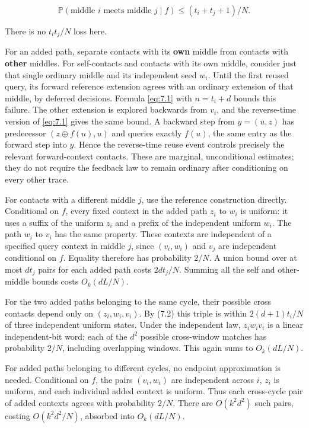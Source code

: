 \documentclass[11pt]{article}
\theoremstyle{remark}
\begin{document}
\[
 \mathbb P(\text{middle }i\text{ meets middle }j\mid f)
 \le(t_i+t_j+1)/N.
 \tag{7.3}\label{eq:7.3}
\]

There is no \(t_it_j/N\) loss here.

For an added path, separate contacts with its \textbf{own} middle from
contacts with \textbf{other} middles. For self-contacts and contacts
with its own middle, consider just that single ordinary middle and its
independent seed \(w_i\). Until the first reused query, its forward
reference extension agrees with an ordinary extension of that middle, by
deferred decisions. Formula \eqref{eq:7.1} with \(n=t_i+d\) bounds this failure.
The other extension is explored backwards from \(v_i\), and the
reverse-time version of \eqref{eq:7.1} gives the same bound. A backward step from
\(y=(u,z)\) has predecessor \((z\oplus f(u),u)\) and queries exactly
\(f(u)\), the same entry as the forward step into \(y\). Hence the
reverse-time reuse event controls precisely the relevant forward-context
contacts. These are marginal, unconditional estimates; they do not
require the feedback law to remain ordinary after conditioning on every
other trace.

For contacts with a different middle \(j\), use the reference
construction directly. Conditional on \(f\), every fixed context in the
added path \(z_i\) to \(w_i\) is uniform: it uses a suffix of the
uniform \(z_i\) and a prefix of the independent uniform \(w_i\). The
path \(w_i\) to \(v_i\) has the same property. These contexts are
independent of a specified query context in middle \(j\), since
\((v_i,w_i)\) and \(v_j\) are independent conditional on \(f\). Equality
therefore has probability \(2/N\). A union bound over at most \(d t_j\)
pairs for each added path costs \(2dt_j/N\). Summing all the self and
other-middle bounds costs \(O_k(dL/N)\).

For the two added paths belonging to the same cycle, their possible
cross contacts depend only on \((z_i,w_i,v_i)\). By (7.2) this
triple is within \(2(d+1)t_i/N\) of three independent uniform states.
Under the independent law, \(z_iw_iv_i\) is a linear independent-bit
word; each of the \(d^2\) possible cross-window matches has probability
\(2/N\), including overlapping windows. This again sums to
\(O_k(dL/N)\).

For added paths belonging to different cycles, no endpoint approximation
is needed. Conditional on \(f\), the pairs \((v_i,w_i)\) are independent
across \(i\), \(z_i\) is uniform, and each individual added context is
uniform. Thus each cross-cycle pair of added contexts agrees with
probability \(2/N\). There are \(O(k^2d^2)\) such pairs, costing
\(O(k^2d^2/N)\), absorbed into \(O_k(dL/N)\).
\end{document}
